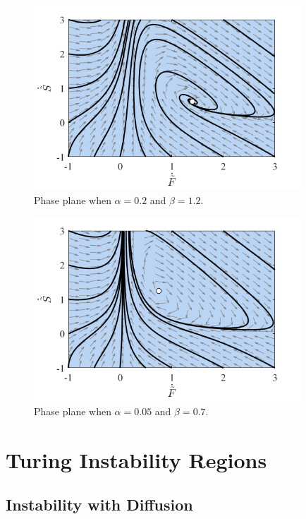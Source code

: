 \documentclass[12pt]{article}
\begin{document}
\begin{figure}[H]
    \centering
    \includegraphics[width = 10cm,trim=5pts 1pts 5pts 17pts, clip]{images/phase_plane.png}
    \caption{Phase plane when $\alpha = 0.2$ and $\beta = 1.2$.}
    \label{fig:phase_plane}
\end{figure}
\vfill
\begin{figure}[H]
    \centering
    \includegraphics[width = 10cm]{images/phase_plane2.png}
    \caption{Phase plane when $\alpha = 0.05$ and $\beta = 0.7$.}
    \label{fig:phase_plane2}
\end{figure}

\vfill















\section{Turing Instability Regions}\label{turing_regions}
\subsection{Instability with Diffusion}\label{eigenvalue}
\end{document}
